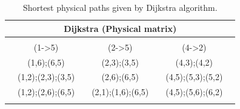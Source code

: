 \begin{table}[H]	
	\centering
	\begin{tabular}{|lcllcllcll|}
		\hline
		\multicolumn{10}{|c|}{Dijkstra (Physical matrix)}                                                                                                                                                          \\ \hline
		& \multicolumn{1}{l}{}          &          &                       & \multicolumn{1}{l}{}          &          &                       & \multicolumn{1}{l}{}          &          &  \\ \cline{2-3} \cline{5-6} \cline{8-9}
		\multicolumn{1}{|l|}{} & \multicolumn{2}{c|}{(1-\textgreater{}5)} & \multicolumn{1}{l|}{} & \multicolumn{2}{c|}{(2-\textgreater{}5)} & \multicolumn{1}{l|}{} & \multicolumn{2}{c|}{(4-\textgreater{}2)} &  \\ \cline{2-3} \cline{5-6} \cline{8-9}
		\multicolumn{1}{|l|}{} & \multicolumn{2}{c|}{(1,6);(6,5)}         & \multicolumn{1}{l|}{} & \multicolumn{2}{c|}{(2,3);(3,5)}         & \multicolumn{1}{l|}{} & \multicolumn{2}{c|}{(4,3);(4,2)}         &  \\ \cline{2-3} \cline{5-6} \cline{8-9}
		\multicolumn{1}{|l|}{} & \multicolumn{2}{c|}{(1,2);(2,3);(3,5)}   & \multicolumn{1}{l|}{} & \multicolumn{2}{c|}{(2,6);(6,5)}         & \multicolumn{1}{l|}{} & \multicolumn{2}{c|}{(4,5);(5,3);(5,2)}   &  \\ \cline{2-3} \cline{5-6} \cline{8-9}
		\multicolumn{1}{|l|}{} & \multicolumn{2}{c|}{(1,2);(2,6);(6,5)}   & \multicolumn{1}{l|}{} & \multicolumn{2}{c|}{(2,1);(1,6);(6,5)}   & \multicolumn{1}{l|}{} & \multicolumn{2}{c|}{(4,5);(5,6);(6,2)}   &  \\ \cline{2-3} \cline{5-6} \cline{8-9}
		& \multicolumn{1}{l}{}          &          &                       & \multicolumn{1}{l}{}          &          &                       & \multicolumn{1}{l}{}          &          &  \\ \hline
	\end{tabular}
	\caption{Shortest physical paths given by Dijkstra algorithm.}
	\label{dijkstra2_example}
\end{table}



